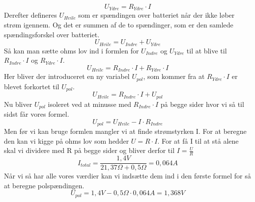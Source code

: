 \begin{equation*}
    U_{Ydre} = R_{Ydre} \cdot I
\end{equation*}
Derefter defineres $U_{Hvile}$ som er spændingen over batteriet når der ikke løber strøm igennem. Og det er summen af de to spændinger, som er den samlede spændingsforskel over batteriet.
\begin{equation*}
    U_{Hvile} = U_{Indre} + U_{Ydre}
\end{equation*}
Så kan man sætte ohms lov ind i formlen for $U_{Indre}$ og $U_{Ydre}$ til at blive til $R_{Indre} \cdot I$ og $R_{Ydre} \cdot I$.
\begin{equation*}
    U_{Hvile} = R_{Indre} \cdot I + R_{Ydre} \cdot I
\end{equation*}
Her bliver der introduceret en ny variabel $U_{pol}$, som kommer fra at $R_{Ydre} \cdot I$ er blevet forkortet til $U_{pol}$.
\begin{equation*}
    U_{Hvile} = R_{Indre} \cdot I + U_{pol}
\end{equation*}
Nu bliver $U_{pol}$ isoleret ved at minusse med $R_{Indre} \cdot I$ på begge sider hvor vi så til sidst får vores formel.
\begin{equation*}
    U_{pol}=U_{Hvile}-I\cdot R_{Indre}
\end{equation*}
Men før vi kan bruge formlen mangler vi at finde strømstyrken I. For at beregne den kan vi kigge på ohms lov som hedder $U = R \cdot I$. For at få I til at stå alene skal vi dividere med R på begge sider og bliver derfor til $I = \frac{U}{R}$
\begin{equation*}
    I_{total}=\frac{1,4V}{21,37\Omega+0,5\Omega}=0,064A
\end{equation*}
Når vi så har alle vores værdier kan vi indsætte dem ind i den første formel for så at beregne polspændingen.
\begin{equation*}
    U_{pol}=1,4V-0,5\Omega\cdot 0,064A=1,368V
\end{equation*}
\newpage